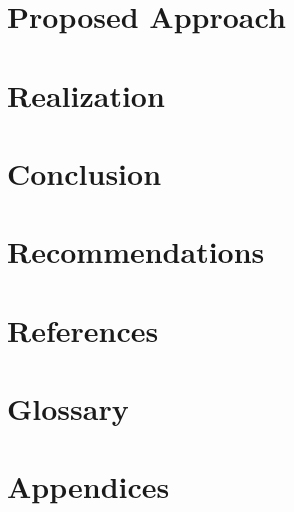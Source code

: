 \documentclass[conference]{IEEEtran}
\begin{document}
\section{Proposed Approach}

%
\section{Realization}

%
\section{Conclusion}

%
\section{Recommendations}

%
\section{References}

%
\section{Glossary}

%
\section{Appendices}
\end{document}
